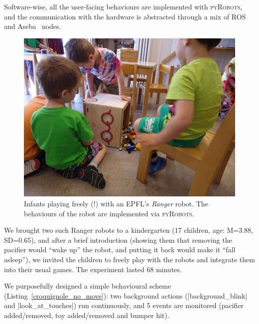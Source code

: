 \documentclass[a4paper, 10pt, conference]{ieeeconf}      %
\newcommand{\pyRobots}{\textsc{pyRobots}}
\begin{document}
Software-wise, all the user-facing behaviours are implemented with \pyRobots{},
and the communication with the hardware is abstracted through a mix of ROS
and Aseba~\cite{magnenat2011aseba} nodes.

\begin{figure}
        \centering
        \includegraphics[width=0.9\columnwidth]{ranger-side}
        \caption{Infants playing freely (!) with an EPFL's \emph{Ranger} robot.
        The behaviours of the robot are implemented via \pyRobots{}.}
        \label{expe-nursery}
\end{figure}

We brought two such Ranger robots to a kindergarten (17 children, age: M=3.88,
SD=0.65), and after a brief introduction (showing them that removing the
pacifier would ``wake up'' the robot, and putting it back would make it ``fall
asleep''), we invited the children to freely play with the robots and integrate
them into their usual games. The experiment lasted 68 minutes.

We purposefully designed a simple behavioural scheme
(Listing~\ref{croquignole_no_move}): two background actions
(\python|background_blink| and \python|look_at_touches|) run continuously, and 5
events are monitored (pacifier added/removed, toy added/removed and bumper hit).
\end{document}
